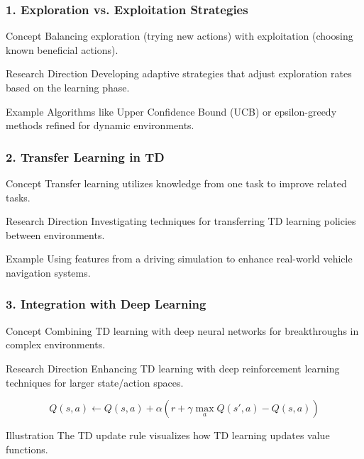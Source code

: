 \documentclass[aspectratio=169]{beamer}
\begin{document}
\begin{frame}[fragile]
    \frametitle{1. Exploration vs. Exploitation Strategies}
    \begin{block}{Concept}
        Balancing exploration (trying new actions) with exploitation (choosing known beneficial actions).
    \end{block}
    \begin{block}{Research Direction}
        Developing adaptive strategies that adjust exploration rates based on the learning phase.
    \end{block}
    \begin{block}{Example}
        Algorithms like Upper Confidence Bound (UCB) or epsilon-greedy methods refined for dynamic environments.
    \end{block}
\end{frame}

\begin{frame}[fragile]
    \frametitle{2. Transfer Learning in TD}
    \begin{block}{Concept}
        Transfer learning utilizes knowledge from one task to improve related tasks.
    \end{block}
    \begin{block}{Research Direction}
        Investigating techniques for transferring TD learning policies between environments.
    \end{block}
    \begin{block}{Example}
        Using features from a driving simulation to enhance real-world vehicle navigation systems.
    \end{block}
\end{frame}

\begin{frame}[fragile]
    \frametitle{3. Integration with Deep Learning}
    \begin{block}{Concept}
        Combining TD learning with deep neural networks for breakthroughs in complex environments.
    \end{block}
    \begin{block}{Research Direction}
        Enhancing TD learning with deep reinforcement learning techniques for larger state/action spaces.
    \end{block}
    \begin{equation}
        Q(s, a) \gets Q(s, a) + \alpha \left( r + \gamma \max_a Q(s', a) - Q(s, a) \right)
    \end{equation}
    \begin{block}{Illustration}
        The TD update rule visualizes how TD learning updates value functions.
    \end{block}
\end{frame}
\end{document}
